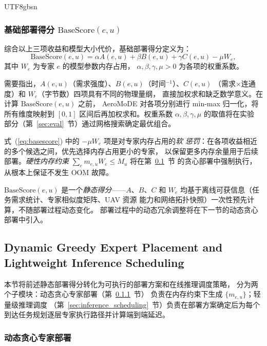 \documentclass[conference]{IEEEtran}
\begin{document}
\begin{CJK*}{UTF8}{gbsn}
\subsubsection{基础部署得分 \texorpdfstring{$\mathrm{BaseScore}(e,u)$}{BaseScore(e,u)}}

综合以上三项收益和模型大小代价，基础部署得分定义为：
\begin{equation}
\mathrm{BaseScore}(e,u) =
\alpha A(e,u) + \beta B(e,u) + \gamma C(e,u) - \mu W_e,
\label{eq:basescore}
\end{equation}
其中 $W_e$ 为专家 $e$ 的模型参数内存占用，
$\alpha,\beta,\gamma,\mu > 0$ 为各项的权重系数。

需要指出，$A(e,u)$（需求强度）、$B(e,u)$（时间$^{-1}$）、$C(e,u)$
（需求$\times$连通度）和 $W_e$（字节数）四项具有不同的物理量纲，
直接加权求和缺乏数学意义。在计算 $\mathrm{BaseScore}(e,u)$ 之前，
AeroMoDE 对各项分别进行 min-max 归一化，将所有维度映射到 $[0,1]$
区间后再加权求和。权重系数 $\alpha,\beta,\gamma,\mu$ 的取值将在实验
部分（第~\ref{sec:eval}~节）通过网格搜索确定最优组合。

式~(\ref{eq:basescore}) 中的 $-\mu W_e$ 项是对专家内存占用的\emph{软
惩罚}：在各项收益相近的多个候选之间，优先选择内存占用更小的专家，
以保留更多内存余量用于后续部署。\emph{硬性内存约束}
$\sum_e m_{e,u}W_e \le M_u$ 将在第~\ref{sec:greedy_scheduling}~节
的贪心部署中强制执行，从根本上保证不发生 OOM 故障。

$\mathrm{BaseScore}(e,u)$ 是一个\emph{静态得分}——$A$、$B$、$C$ 和
$W_e$ 均基于离线可获信息（任务需求统计、专家相似度矩阵、UAV 资源
能力和网络拓扑快照）一次性预先计算，不随部署过程动态变化。
部署过程中的动态冗余调整将在下一节的动态贪心部署中引入。

\subsection{Dynamic Greedy Expert Placement and Lightweight Inference Scheduling}
\label{sec:greedy_scheduling}

本节将前述静态部署得分转化为可执行的部署方案和在线推理调度策略，
分为两个子模块：动态贪心专家部署（第~\ref{sec:greedy_placement}~节）
负责在内存约束下生成 $\{m_{e,u}\}$；轻量级推理调度
（第~\ref{sec:inference_scheduling}~节）负责在部署方案确定后为每个
到达任务规划逐层专家执行路径并计算端到端延迟。

\subsubsection{动态贪心专家部署}
\label{sec:greedy_placement}


\end{CJK*}
\end{document}
